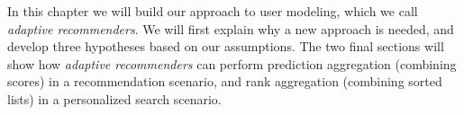 \label{chap:methods}

In this chapter we will build our approach to user modeling, which we call \emph{adaptive recommenders}.
We will first explain why a new approach is needed, and develop three hypotheses based on our assumptions.
The two final sections will show how \emph{adaptive recommenders}
can perform prediction aggregation (combining scores) in a recommendation scenario,
and rank aggregation (combining sorted lists) in a personalized search scenario.








%
